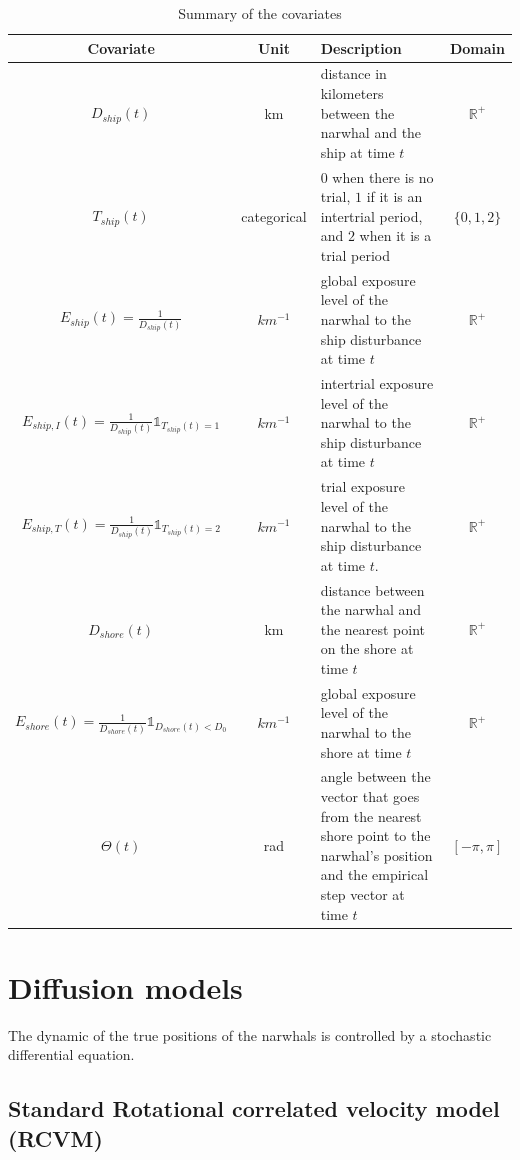 \documentclass[11pt]{article}
\newcommand {\R}{\mathbb{R}}
\newcommand {\1}{\mathbb{1}}
\begin{document}
\begin{table}[H]
\centering
\begin{tabular}{|c|c|p{8cm}|c|}
\hline
Covariate & Unit & Description & Domain \\
\hline
$D_{ship}(t)$ & km & distance in kilometers between the narwhal and the ship at time $t$ & $\R^+$ \\
\hline
$T_{ship}(t)$  & categorical & $0$ when there is no trial, $1$ if it is an intertrial period, and $2$ when it is a trial period & $\{0,1,2\}$\\
\hline
$E_{ship}(t)=\frac{1}{D_{ship}(t)}$ & $km^{-1}$ & global exposure level of the narwhal to the ship disturbance at time $t$ & $\R^+$ \\
\hline
$E_{ship,I}(t)=\frac{1}{D_{ship}(t)}\mathbb{1}_{T_{ship}(t)=1}$& $km^{-1}$ & intertrial exposure level of the narwhal to the ship disturbance at time $t$ & $\R^+$ \\
\hline
 $E_{ship,T}(t)=\frac{1}{D_{ship}(t)}\mathbb{1}_{T_{ship}(t)=2}$ & $km^{-1}$ & trial exposure level of the narwhal to the ship disturbance at time $t$. & $\R^+$\\
 \hline
 $D_{shore}(t)$ & km & distance between the narwhal and the nearest point on the shore at time $t$ & $\R^+$ \\
 \hline
 $E_{shore}(t)=\frac{1}{D_{shore}(t)} \1_{D_{shore}(t)<D_0}$ & $km^{-1}$ & global exposure level of the narwhal to the shore at time $t$ & $\R^+$ \\
 \hline
 $\Theta(t)$ & rad & angle between the vector that goes from the nearest shore point to the narwhal's position and the empirical step vector at time $t$  & $[-\pi,\pi]$ \\
 \hline 
\end{tabular}
\caption{Summary of the covariates}
\label{tab: covariates}
\end{table}







\section{Diffusion models}

The dynamic of the true positions of the narwhals is controlled by a stochastic differential equation.

\subsection{Standard Rotational correlated velocity model (RCVM)}
\label{section: RCVM}
\end{document}
